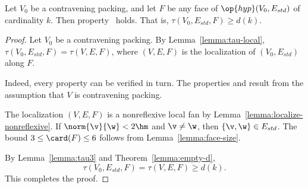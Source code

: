 \begin{lemma}[]\label{lemma:main} 
Let $V_0$ be a contravening packing, and let $F$ be any
face of $\op{hyp}(V_0,E_{std})$ of cardinality $k$.  Then
 property~ holds.  
That is,
$\tau(V_0,E_{std},F) \ge d(k)$.
\end{lemma}
%
%




\begin{proof}
  Let $V_0$ be a contravening packing.  By
  Lemma~\ref{lemma:tau-local}, $\tau(V_0,E_{std},F)=\tau(V,E,F)$, where
  $(V,E,F)$ is the localization of $(V_0,E_{std})$ along $F$.

    Indeed, every property can be
  verified in turn.  The properties  and 
  result from the assumption that $V$ is contravening packing.

  The localization $(V,E,F)$ is a nonreflexive local fan
by Lemma~\ref{lemma:localize-nonreflexive}.
 If $\norm{\v}{\w}<2\hm$ and $\v\ne \w$, then $\{\v,\w\}\in
E_{std}$.
%
%
 The bound $3\le \card(F)\le 6$
follows from Lemma~\ref{lemma:face-size}.


By Lemma~\ref{lemma:tau3} and Theorem~\ref{lemma:empty-d}, 
\[ 
\tau(V_0,E_{std},F)=\tau(V,E,F) \ge d (k).
\] 
This completes the proof.
\end{proof}



